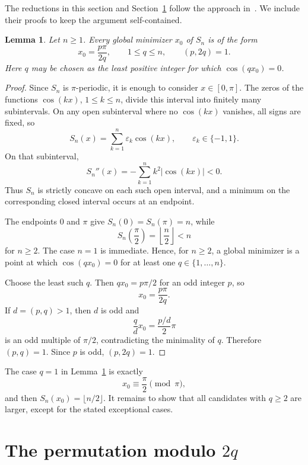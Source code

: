 \documentclass[11pt]{article}
\newtheorem{lemma}{Lemma}
\begin{document}
The reductions in this section and Section~\ref{sec:permutation} follow
the approach in~\cite{MSE2022}. We include their proofs to keep the
argument self-contained.

\begin{lemma}\label{lem:concavity}
Let \(n\ge 1\). Every global minimizer \(x_0\) of \(S_n\) is of the form
\[
        x_0=\frac{p\pi}{2q},
        \qquad
        1\le q\le n,
        \qquad
        (p,2q)=1.
\]
Here \(q\) may be chosen as the least positive integer for which \(\cos(qx_0)=0\).
\end{lemma}

\begin{proof}
Since \(S_n\) is \(\pi\)-periodic, it is enough to consider \(x\in[0,\pi]\). The zeros of the functions \(\cos(kx)\), \(1\le k\le n\), divide this interval into finitely many subintervals. On any open subinterval where no \(\cos(kx)\) vanishes, all signs are fixed, so
\[
        S_n(x)=\sum_{k=1}^n \varepsilon_k\cos(kx),
        \qquad \varepsilon_k\in\{-1,1\}.
\]
On that subinterval,
\[
        S_n''(x)
        =-\sum_{k=1}^n k^2|\cos(kx)|<0.
\]
Thus \(S_n\) is strictly concave on each such open interval, and a minimum on the corresponding closed interval occurs at an endpoint.

The endpoints \(0\) and \(\pi\) give \(S_n(0)=S_n(\pi)=n\), while
\[
        S_n\!\left(\frac{\pi}{2}\right)
        =\left\lfloor\frac n2\right\rfloor<n
\]
for \(n\ge2\). The case \(n=1\) is immediate. Hence, for \(n\ge2\), a global minimizer is a point at which \(\cos(qx_0)=0\) for at least one \(q\in\{1,\dots,n\}\).

Choose the least such \(q\). Then \(qx_0=p\pi/2\) for an odd integer \(p\), so
\[
        x_0=\frac{p\pi}{2q}.
\]
If \(d=(p,q)>1\), then \(d\) is odd and
\[
        \frac qd x_0=\frac{p/d}{2}\pi
\]
is an odd multiple of \(\pi/2\), contradicting the minimality of \(q\). Therefore \((p,q)=1\). Since \(p\) is odd, \((p,2q)=1\).
\end{proof}

The case \(q=1\) in Lemma~\ref{lem:concavity} is exactly
\[
        x_0\equiv \frac{\pi}{2}\pmod{\pi},
\]
and then \(S_n(x_0)=\lfloor n/2\rfloor\). It remains to show that all candidates with \(q\ge2\) are larger, except for the stated exceptional cases.

\section{\texorpdfstring{The permutation modulo \(2q\)}{The permutation modulo 2q}}\label{sec:permutation}
\end{document}
